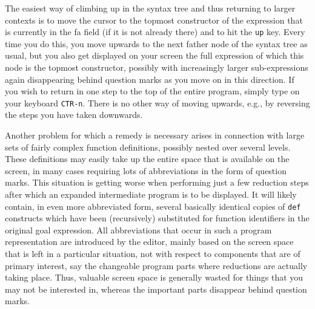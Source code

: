 The easiest way of {\mys climbing up} in the syntax tree and thus returning
to larger contexts is to move the cursor to the topmost constructor of the expression that
is currently in  the {\sc fa} field (if it is not already there) and to hit the {\tt up} key.  Every time you do this,
you move upwards to the next father node of the syntax tree as usual,  but you also
 get displayed on your screen the full
expression of which this node is the topmost constructor, possibly with increasingly  larger
 sub-expressions again  disappearing behind question marks as you move on in this direction.
If you wish to return in one step to the top of the entire program, simply type
on your keyboard {\tt CTR-n}. There is no other way of moving upwards, e.g.,
by reversing the steps you have taken downwards. 

Another problem for which a remedy is necessary arises in connection with large sets of 
fairly complex {\mys function definitions}, possibly nested over several levels. 
These definitions may easily take up the entire space that is available on the screen, 
in many cases requiring lots of abbreviations in the form of question marks. This situation is
getting worse when performing just a few reduction steps after which an expanded intermediate
program is to be displayed. It will likely contain, in even more abbreviated form,
 several basically identical copies of
{\tt def} constructs which have been (recursively) substituted for function identifiers in
 the original goal expression. All abbreviations that occur in such a
program representation are introduced by the
editor, mainly based on the screen space that is left in a particular situation, not
with respect to components that are of primary interest, say
 the changeable program parts where reductions are actually 
taking place. Thus, valuable screen space   is generally  wasted for things that you
may not be interested in, whereas the important parts disappear behind question marks.
 
